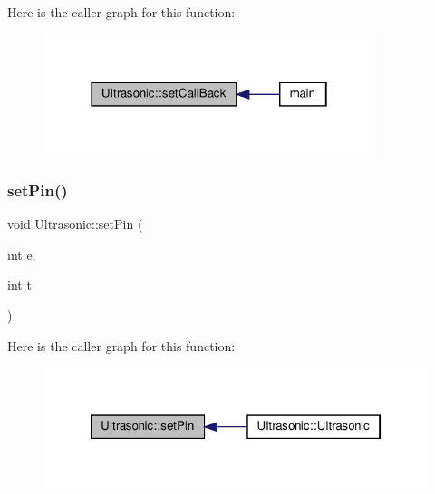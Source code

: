 Here is the caller graph for this function\+:
\nopagebreak
\begin{figure}[H]
\begin{center}
\leavevmode
\includegraphics[width=274pt]{classUltrasonic_a0b9d6fed8f4d6a207a91f19763ba70fe_icgraph}
\end{center}
\end{figure}
\mbox{\label{classUltrasonic_a5ceb2f35156c7e6b6c22538b090b1923}} 
\subsubsection{\texorpdfstring{set\+Pin()}{setPin()}}
{\footnotesize\ttfamily void Ultrasonic\+::set\+Pin (\begin{DoxyParamCaption}\item[{int}]{e,  }\item[{int}]{t }\end{DoxyParamCaption})\hspace{0.3cm}{\ttfamily [private]}}

Here is the caller graph for this function\+:
\nopagebreak
\begin{figure}[H]
\begin{center}
\leavevmode
\includegraphics[width=322pt]{classUltrasonic_a5ceb2f35156c7e6b6c22538b090b1923_icgraph}
\end{center}
\end{figure}
\mbox{\label{classUltrasonic_aa0ede289109954e5b3c713bbebe8c8e1}} 
